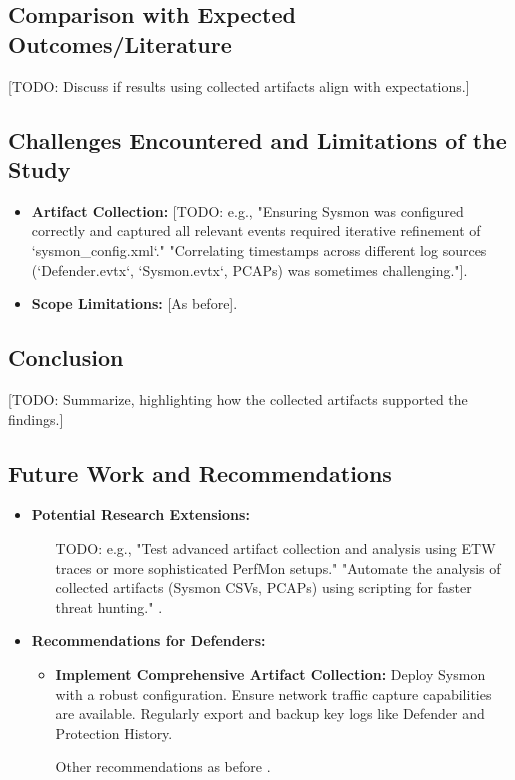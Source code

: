 \documentclass[11pt]{article}
\begin{document}
	\subsection{Comparison with Expected Outcomes/Literature}
	[TODO: Discuss if results using collected artifacts align with expectations.]
	
	\subsection{Challenges Encountered and Limitations of the Study}
	\begin{itemize}
		\item \textbf{Artifact Collection:} [TODO: e.g., "Ensuring Sysmon was configured correctly and captured all relevant events required iterative refinement of `sysmon_config.xml`." "Correlating timestamps across different log sources (`Defender.evtx`, `Sysmon.evtx`, PCAPs) was sometimes challenging."].
		\item \textbf{Scope Limitations:} [As before].
	\end{itemize}
	
	\subsection{Conclusion}
	[TODO: Summarize, highlighting how the collected artifacts supported the findings.]
	
	\subsection{Future Work and Recommendations}
	\begin{itemize}
		\item \textbf{Potential Research Extensions:}
		\begin{itemize}
			\item [TODO: e.g., "Test advanced artifact collection and analysis using ETW traces or more sophisticated PerfMon setups." "Automate the analysis of collected artifacts (Sysmon CSVs, PCAPs) using scripting for faster threat hunting."].
		\end{itemize}
		\item \textbf{Recommendations for Defenders:}
		\begin{itemize}
			\item \textbf{Implement Comprehensive Artifact Collection:} Deploy Sysmon with a robust configuration. Ensure network traffic capture capabilities are available. Regularly export and backup key logs like Defender and Protection History.
			\item [Other recommendations as before].
		\end{itemize}
	\end{itemize}
	\newpage
	
\end{document}
